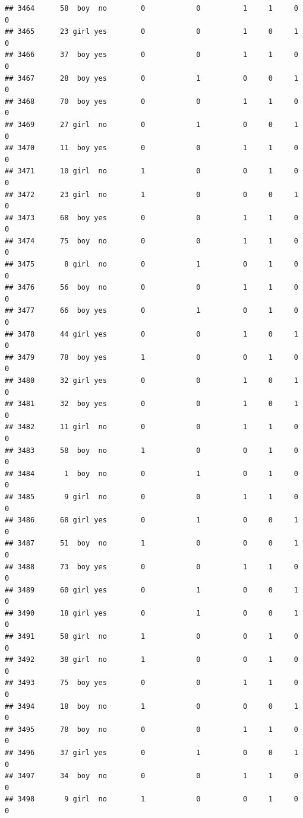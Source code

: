 \documentclass[man]{apa6}
\begin{document}
\begin{verbatim}
## 3464      58  boy  no        0            0          1     1     0     0
## 3465      23 girl yes        0            0          1     0     1     0
## 3466      37  boy yes        0            0          1     1     0     0
## 3467      28  boy yes        0            1          0     0     1     0
## 3468      70  boy yes        0            0          1     1     0     0
## 3469      27 girl  no        0            1          0     0     1     0
## 3470      11  boy yes        0            0          1     1     0     0
## 3471      10 girl  no        1            0          0     1     0     0
## 3472      23 girl  no        1            0          0     0     1     0
## 3473      68  boy yes        0            0          1     1     0     0
## 3474      75  boy  no        0            0          1     1     0     0
## 3475       8 girl  no        0            1          0     1     0     0
## 3476      56  boy  no        0            0          1     1     0     0
## 3477      66  boy yes        0            1          0     1     0     0
## 3478      44 girl yes        0            0          1     0     1     0
## 3479      78  boy yes        1            0          0     1     0     0
## 3480      32 girl yes        0            0          1     0     1     0
## 3481      32  boy yes        0            0          1     0     1     0
## 3482      11 girl  no        0            0          1     1     0     0
## 3483      58  boy  no        1            0          0     1     0     0
## 3484       1  boy  no        0            1          0     1     0     0
## 3485       9 girl  no        0            0          1     1     0     0
## 3486      68 girl yes        0            1          0     0     1     0
## 3487      51  boy  no        1            0          0     0     1     0
## 3488      73  boy yes        0            0          1     1     0     0
## 3489      60 girl yes        0            1          0     0     1     0
## 3490      18 girl yes        0            1          0     0     1     0
## 3491      58 girl  no        1            0          0     1     0     0
## 3492      38 girl  no        1            0          0     1     0     0
## 3493      75  boy yes        0            0          1     1     0     0
## 3494      18  boy  no        1            0          0     0     1     0
## 3495      78  boy  no        0            0          1     1     0     0
## 3496      37 girl yes        0            1          0     0     1     0
## 3497      34  boy  no        0            0          1     1     0     0
## 3498       9 girl  no        1            0          0     1     0     0

\end{verbatim}
\end{document}
